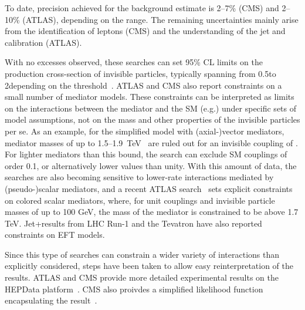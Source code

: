 To date, precision achieved for the background estimate is 2--7\% (CMS) and 2--10\% (ATLAS), depending on the \MET range.
The remaining uncertainties mainly arise from the identification of leptons (CMS) and the understanding of the jet and \MET calibration (ATLAS). 


With no excesses observed, these searches can set 95\% CL limits on the production cross-section of invisible particles, typically spanning from 0.5\pb to 2\fb depending on the \MET threshold~\cite{Aaboud:2017phn}.
ATLAS and CMS also report constraints on a small number of mediator models.
These constraints can be interpreted as limits on the interactions between the mediator and the SM (e.g.\gq) under specific sets of model assumptions, not on the mass and other properties of the invisible particles per se.
As an example, for the simplified model with (axial-)vector mediators, mediator masses of up to 1.5--1.9~TeV~\cite{Aaboud:2017phn,Sirunyan:2017jix} are ruled out for an invisible coupling of . For lighter mediators than this bound, the search can exclude SM couplings of order 0.1, or alternatively lower \gdm values than unity.
With this amount of data, the searches are also becoming sensitive to lower-rate interactions mediated by (pseudo-)scalar mediators, and a recent ATLAS search~\cite{Aaboud:2017phn} sets explicit constraints on colored scalar mediators, where, for unit couplings and invisible particle masses of up to 100 GeV, the mass of the mediator is constrained to be above 1.7 TeV. 
Jet+\MET results from LHC Run-1 and the Tevatron have also reported constraints on EFT models.  

Since this type of searches can constrain a wider variety of interactions than explicitly considered, steps have been taken to allow easy reinterpretation of the results. 
ATLAS and CMS provide more detailed experimental results on the HEPData platform~\cite{Maguire:2017ypu}.
CMS also proivdes a simplified likelihood function encapsulating the result~\cite{Collaboration:2242860,Sirunyan:2017jix}.



